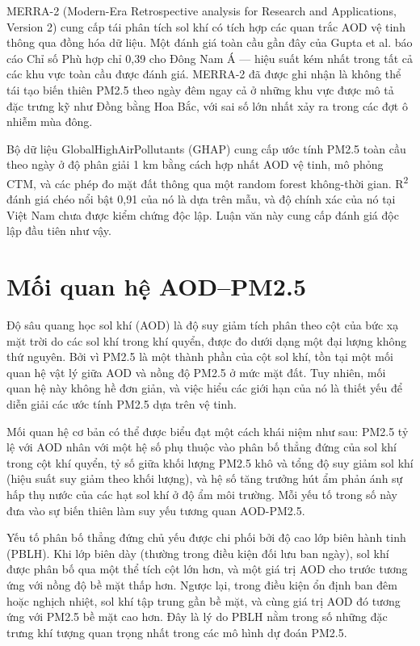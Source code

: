 MERRA-2 (Modern-Era Retrospective analysis for Research and Applications, Version 2) cung cấp tái phân tích sol khí có tích hợp các quan trắc AOD vệ tinh thông qua đồng hóa dữ liệu. Một đánh giá toàn cầu gần đây của Gupta et al. \cite{gupta2026} báo cáo Chỉ số Phù hợp chỉ 0,39 cho Đông Nam Á --- hiệu suất kém nhất trong tất cả các khu vực toàn cầu được đánh giá. MERRA-2 đã được ghi nhận là không thể tái tạo biến thiên PM2.5 theo ngày đêm ngay cả ở những khu vực được mô tả đặc trưng kỹ như Đồng bằng Hoa Bắc, với sai số lớn nhất xảy ra trong các đợt ô nhiễm mùa đông.

Bộ dữ liệu GlobalHighAirPollutants (GHAP) cung cấp ước tính PM2.5 toàn cầu theo ngày ở độ phân giải 1 km bằng cách hợp nhất AOD vệ tinh, mô phỏng CTM, và các phép đo mặt đất thông qua một random forest không-thời gian. R\textsuperscript{2} đánh giá chéo nổi bật 0,91 của nó là dựa trên mẫu, và độ chính xác của nó tại Việt Nam chưa được kiểm chứng độc lập. Luận văn này cung cấp đánh giá độc lập đầu tiên như vậy.


\section{Mối quan hệ AOD--PM2.5}

Độ sâu quang học sol khí (AOD) là độ suy giảm tích phân theo cột của bức xạ mặt trời do các sol khí trong khí quyển, được đo dưới dạng một đại lượng không thứ nguyên. Bởi vì PM2.5 là một thành phần của cột sol khí, tồn tại một mối quan hệ vật lý giữa AOD và nồng độ PM2.5 ở mức mặt đất. Tuy nhiên, mối quan hệ này không hề đơn giản, và việc hiểu các giới hạn của nó là thiết yếu để diễn giải các ước tính PM2.5 dựa trên vệ tinh.

Mối quan hệ cơ bản có thể được biểu đạt một cách khái niệm như sau: PM2.5 tỷ lệ với AOD nhân với một hệ số phụ thuộc vào phân bố thẳng đứng của sol khí trong cột khí quyển, tỷ số giữa khối lượng PM2.5 khô và tổng độ suy giảm sol khí (hiệu suất suy giảm theo khối lượng), và hệ số tăng trưởng hút ẩm phản ánh sự hấp thụ nước của các hạt sol khí ở độ ẩm môi trường. Mỗi yếu tố trong số này đưa vào sự biến thiên làm suy yếu tương quan AOD-PM2.5.

Yếu tố phân bố thẳng đứng chủ yếu được chi phối bởi độ cao lớp biên hành tinh (PBLH). Khi lớp biên dày (thường trong điều kiện đối lưu ban ngày), sol khí được phân bố qua một thể tích cột lớn hơn, và một giá trị AOD cho trước tương ứng với nồng độ bề mặt thấp hơn. Ngược lại, trong điều kiện ổn định ban đêm hoặc nghịch nhiệt, sol khí tập trung gần bề mặt, và cùng giá trị AOD đó tương ứng với PM2.5 bề mặt cao hơn. Đây là lý do PBLH nằm trong số những đặc trưng khí tượng quan trọng nhất trong các mô hình dự đoán PM2.5.

